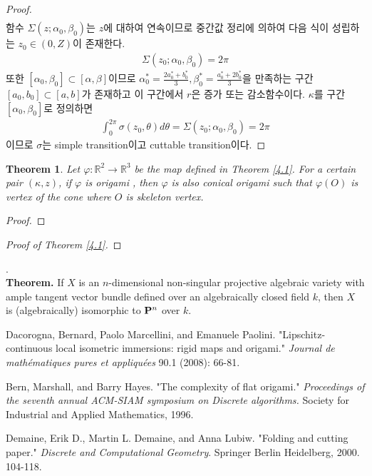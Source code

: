 \documentclass{amsart}
\theoremstyle{plain}
\newtheorem{theorem}{Theorem}[section]
\theoremstyle{definition}
\theoremstyle{remark}
\begin{document}
\begin{proof}
\begin{align*}
\end{align*}
함수 $\Sigma(z;\alpha_0,\beta_0)$는 $z$에 대하여 연속이므로 중간값 정리에 의하여 다음 식이 성립하는 $z_0\in(0,Z)$이 존재한다.
\begin{align*}
\Sigma(z_0;\alpha_0,\beta_0)=2\pi
\end{align*}
또한 $[\alpha_0,\beta_0]\subset[\alpha,\beta]$이므로 $\alpha_0^*=\frac{2a_0^*+b_0^*}3, \beta_0^*=\frac{a_0^*+2b_0^*}3$을 만족하는 구간 $[a_0,b_0]\subset[a,b]$가 존재하고 이 구간에서 $r$은 증가 또는 감소함수이다.
$\kappa$를 구간 $[\alpha_0,\beta_0]$로 정의하면
\begin{align*}
\int_0^{2\pi}\sigma(z_0,\theta)d\theta=\Sigma(z_0;\alpha_0,\beta_0)=2\pi
\end{align*}
이므로 $\sigma$는 simple transition이고 cuttable transition이다.
\fi
\end{proof}


\begin{theorem}\label{4.5}%
Let $\varphi:{\mathbb R}^2\to{\mathbb R}^3$ be the map defined in Theorem \ref{4.1}.
For a certain pair $(\kappa,z)$, if $\varphi$ is origami , then $\varphi$ is also conical origami such that $\varphi(O)$ is vertex of the cone where $O$ is skeleton vertex.
\end{theorem}

\begin{proof}

\end{proof}

\begin{proof}[Proof of Theorem \ref{4.1}]

\end{proof}


\bigskip
.\\
\textbf{Theorem.} If $X$ is an $n$-dimensional non-singular projective algebraic variety with ample tangent vector bundle defined over an algebraically closed field $k$, then $X$ is (algebraically) isomorphic to ${\bold P}^n$ over $k$.

\bigskip




\begin{thebibliography}{99}

 Dacorogna, Bernard, Paolo Marcellini, and Emanuele Paolini. "Lipschitz-continuous local isometric immersions: rigid maps and origami." {\it Journal de mathématiques pures et appliquées} 90.1 (2008): 66-81.

 Bern, Marshall, and Barry Hayes. "The complexity of flat origami." {\it Proceedings of the seventh annual ACM-SIAM symposium on Discrete algorithms.} Society for Industrial and Applied Mathematics, 1996.

 Demaine, Erik D., Martin L. Demaine, and Anna Lubiw. "Folding and cutting paper." {\it Discrete and Computational Geometry}. Springer Berlin Heidelberg, 2000. 104-118.



\end{thebibliography}
\end{document}
